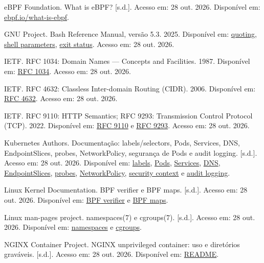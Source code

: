 \documentclass[12pt,openany,oneside,a4paper,chapter=TITLE,english,brazil]{abntex2}
\newenvironment{referenciasabnt}
  {\begin{flushleft}\SingleSpacing\setlength{\parindent}{0pt}\setlength{\parskip}{\baselineskip}}
  {\end{flushleft}}
\begin{document}
\begin{apendicesenv}
\begin{referenciasabnt}
eBPF Foundation. What is eBPF? {[}s.d.{]}. Acesso em: 28 out. 2026. Disponível em: \href{https://ebpf.io/what-is-ebpf/}{ebpf.io/what-is-ebpf}.

GNU Project. Bash Reference Manual, versão 5.3. 2025. Disponível em: \href{https://www.gnu.org/software/bash/manual/html_node/Quoting.html}{quoting}, \href{https://www.gnu.org/software/bash/manual/html_node/Shell-Parameters.html}{shell parameters}, \href{https://www.gnu.org/software/bash/manual/html_node/Exit-Status.html}{exit status}. Acesso em: 28 out. 2026.

IETF. RFC 1034: Domain Names --- Concepts and Facilities. 1987. Disponível em: \href{https://www.rfc-editor.org/rfc/rfc1034}{RFC 1034}. Acesso em: 28 out. 2026.

IETF. RFC 4632: Classless Inter-domain Routing (CIDR). 2006. Disponível em: \href{https://www.rfc-editor.org/rfc/rfc4632}{RFC 4632}. Acesso em: 28 out. 2026.

IETF. RFC 9110: HTTP Semantics; RFC 9293: Transmission Control Protocol (TCP). 2022. Disponível em: \href{https://www.rfc-editor.org/rfc/rfc9110}{RFC 9110} e \href{https://www.rfc-editor.org/rfc/rfc9293}{RFC 9293}. Acesso em: 28 out. 2026.

Kubernetes Authors. Documentação: labels/selectors, Pods, Services, DNS, EndpointSlices, probes, NetworkPolicy, segurança de Pods e audit logging. {[}s.d.{]}. Acesso em: 28 out. 2026. Disponível em: \href{https://kubernetes.io/docs/concepts/overview/working-with-objects/labels/}{labels}, \href{https://kubernetes.io/docs/concepts/workloads/pods/}{Pods}, \href{https://kubernetes.io/docs/concepts/services-networking/service/}{Services}, \href{https://kubernetes.io/docs/concepts/services-networking/dns-pod-service/}{DNS}, \href{https://kubernetes.io/docs/concepts/services-networking/endpoint-slices/}{EndpointSlices}, \href{https://kubernetes.io/docs/concepts/workloads/pods/probes/}{probes}, \href{https://kubernetes.io/docs/concepts/services-networking/network-policies/}{NetworkPolicy}, \href{https://kubernetes.io/docs/tasks/configure-pod-container/security-context/}{security context} e \href{https://kubernetes.io/docs/tasks/debug/debug-cluster/audit/}{audit logging}.

Linux Kernel Documentation. BPF verifier e BPF maps. {[}s.d.{]}. Acesso em: 28 out. 2026. Disponível em: \href{https://docs.kernel.org/bpf/verifier.html}{BPF verifier} e \href{https://docs.kernel.org/bpf/maps.html}{BPF maps}.

Linux man-pages project. namespaces(7) e cgroups(7). {[}s.d.{]}. Acesso em: 28 out. 2026. Disponível em: \href{https://man7.org/linux/man-pages/man7/namespaces.7.html}{namespaces} e \href{https://man7.org/linux/man-pages/man7/cgroups.7.html}{cgroups}.

NGINX Container Project. NGINX unprivileged container: uso e diretórios graváveis. {[}s.d.{]}. Acesso em: 28 out. 2026. Disponível em: \href{https://github.com/nginx/docker-nginx-unprivileged/blob/main/README.md}{README}.

\end{referenciasabnt}

\end{apendicesenv}
\end{document}
